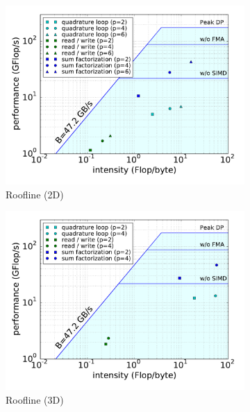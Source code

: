 \documentclass[times,doublespace]{nmeauth}
\begin{document}
{\begin{figure}[!ht]
  \centering
  \begin{subfigure}[b]{0.49\textwidth}
      \centering
      \includegraphics[width=\textwidth]{LIKWID_Emmy_RRZE_breakdown_roofline_2d.pdf}
      \caption{Roofline (2D)}
      \label{fig:roofline_2d_tensor4}
  \end{subfigure}
  \begin{subfigure}[b]{0.49\textwidth}
    \centering
    \includegraphics[width=\textwidth]{LIKWID_Emmy_RRZE_breakdown_roofline_3d.pdf}
    \caption{Roofline (3D)}
    \label{fig:roofline_3d_tensor4}
  \end{subfigure}
  ~
  \begin{subfigure}[b]{0.49\textwidth}

\end{subfigure}
\end{figure}}
\end{document}
